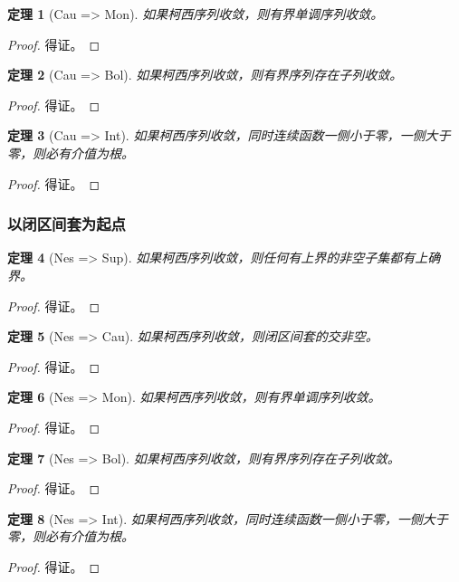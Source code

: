 \documentclass[a4paper,12pt]{article}
\newtheorem{theorem}{定理}
\begin{document}
\begin{theorem}[Cau => Mon]
  如果柯西序列收敛，则有界单调序列收敛。
\end{theorem}
\begin{proof}
    得证。
\end{proof}

\begin{theorem}[Cau => Bol]
  如果柯西序列收敛，则有界序列存在子列收敛。
\end{theorem}
\begin{proof}
    得证。
\end{proof}

\begin{theorem}[Cau => Int]
  如果柯西序列收敛，同时连续函数一侧小于零，一侧大于零，则必有介值为根。
\end{theorem}
\begin{proof}
    得证。
\end{proof}

\subsubsection{以闭区间套为起点}

\begin{theorem}[Nes => Sup]
  如果柯西序列收敛，则任何有上界的非空子集都有上确界。
\end{theorem}
\begin{proof}
    得证。
\end{proof}

\begin{theorem}[Nes => Cau]
  如果柯西序列收敛，则闭区间套的交非空。
\end{theorem}
\begin{proof}
    得证。
\end{proof}

\begin{theorem}[Nes => Mon]
  如果柯西序列收敛，则有界单调序列收敛。
\end{theorem}
\begin{proof}
    得证。
\end{proof}

\begin{theorem}[Nes => Bol]
  如果柯西序列收敛，则有界序列存在子列收敛。
\end{theorem}
\begin{proof}
    得证。
\end{proof}

\begin{theorem}[Nes => Int]
  如果柯西序列收敛，同时连续函数一侧小于零，一侧大于零，则必有介值为根。
\end{theorem}
\begin{proof}
    得证。
\end{proof}
\end{document}
